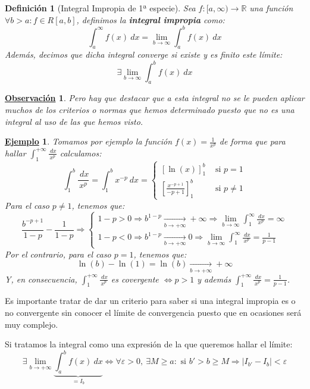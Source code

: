 \documentclass[10pt,a4paper,openright]{book}
\theoremstyle{break}
\newtheorem{defi}{Definición}[chapter]
\newtheorem{obs}{\underline{Observación}}[chapter]
\newtheorem{ej}{\underline{Ejemplo}}[chapter]
\newcommand{\dif}[1]{\ d#1}
\begin{document}
\begin{defi}[Integral Impropia de 1ª especie]
Sea $f:[a,\infty)\rightarrow  \mathbb R$ una función $\forall b>a : f\in R[a,b]$, definimos la \textbf{integral impropia} como:
$$\int_{a}^{\infty} f(x)\dif{x} = \lim_{b \to \infty} \int_{a}^{b} f(x)\dif{x}$$
Además, decimos que dicha integral converge si existe y es finito este límite:
$$\exists \lim_{b \to \infty} \int_{a}^{b} f(x)\dif{x} $$
\end{defi}

\begin{obs}
Pero hay que destacar que a esta integral no se le pueden aplicar muchos de los criterios o normas que hemos determinado puesto que no es una integral al uso de las que hemos visto.
\end{obs}

\begin{ej}
Tomamos por ejemplo la función $f(x) =\frac{1}{x^p}$ de forma que para hallar $\displaystyle \int_{1}^{+\infty} \frac{\dif{x}}{x^p}$ calculamos:
$$\int_{1}^{b} \frac{\dif{x}}{x^p} = \int_{1}^{b} x^{-p} \dif{x} = \begin{cases} \displaystyle [\ln(x)]^b_1 & \mbox{ si } p=1 \\ \displaystyle \left[\frac{x^{-p+1}}{-p+1}\right]^b_1 & \mbox{ si } p \neq 1\end{cases}$$
Para el caso $p\neq 1$, tenemos que:
$$\frac{b^{-p+1}}{1-p} - \frac{1}{1-p} \Rightarrow
\begin{cases}
1-p > 0 \Rightarrow b^{1-p} \underset{b \to +\infty} {\longrightarrow
}+\infty \Rightarrow \displaystyle \lim_{b \to \infty} \int_{1}^{\infty} \frac{\dif{x}}{x^p} = \infty 
\\
1-p<0 \Rightarrow b^{1-p} \underset{b \to +\infty}{\longrightarrow
} 0 \Rightarrow \displaystyle\lim_{b \to \infty} \int_{1}^{\infty} \frac{\dif{x}}{x^p} = \frac{1}{p-1}
\end{cases}
$$
Por el contrario, para el caso $p=1$, tenemos que:
$$\ln(b)-\ln(1) = \ln(b) \underset{b \to +\infty}{\longrightarrow}+\infty$$
Y, en consecuencia, $\displaystyle \int_{1}^{+\infty} \frac{\dif{x}}{x^p}$ es covergente $\Leftrightarrow  p > 1$ y además $\displaystyle \int_{1}^{+\infty} \frac{\dif{x}}{x^p} = \frac{1}{p-1}$.
\end{ej}

Es importante tratar de dar un criterio para saber si una integral impropia es o no convergente sin conocer el límite de convergencia puesto que en ocasiones será muy complejo.

Si tratamos la integral como una expresión de la que queremos hallar el límite:
$$\exists \lim_{b \to +\infty} \underbrace{\int_{a}^{b} f(x)\dif{x}}_{=I_b} \Leftrightarrow \forall \varepsilon > 0,\ \exists M \geq a: \mbox{ si } b'>b\geq M \Rightarrow |I_{b'} - I_b| < \varepsilon$$
\end{document}
